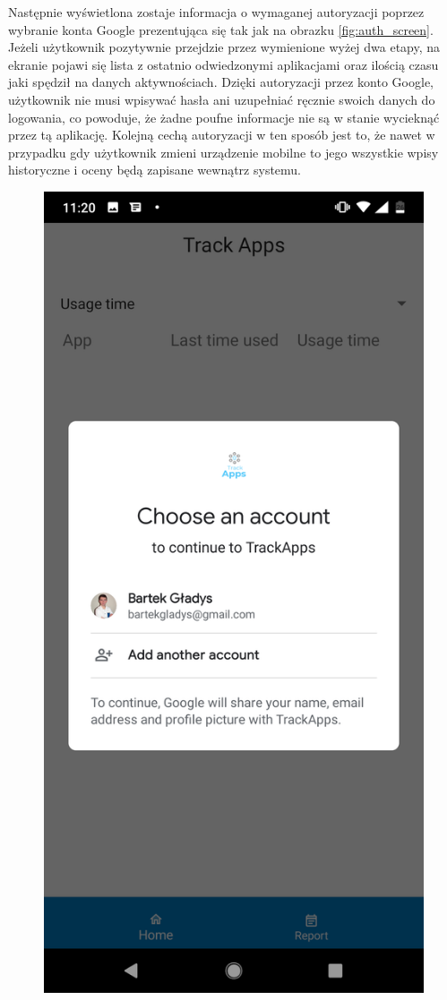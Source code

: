 \documentclass[a4paper,twoside,12pt]{book}
\begin{document}
\begin{description}
Następnie wyświetlona zostaje informacja o wymaganej autoryzacji poprzez wybranie konta Google prezentująca się tak jak na obrazku \ref{fig:auth_screen}. Jeżeli użytkownik pozytywnie przejdzie przez wymienione wyżej dwa etapy, na ekranie pojawi się lista z ostatnio odwiedzonymi aplikacjami oraz ilością czasu jaki spędził na danych aktywnościach. Dzięki autoryzacji przez konto Google, użytkownik nie musi wpisywać hasła ani uzupełniać ręcznie swoich danych do logowania, co powoduje, że żadne poufne informacje nie są w stanie wycieknąć przez tą aplikację. Kolejną cechą autoryzacji w ten sposób jest to, że nawet w przypadku gdy użytkownik zmieni urządzenie mobilne to jego wszystkie wpisy historyczne i oceny będą zapisane wewnątrz systemu.

\begin{figure}[h!]
    \centering
    \includegraphics[scale=0.1]{images/account_screen.png}

\end{figure}
\end{description}
\end{document}
